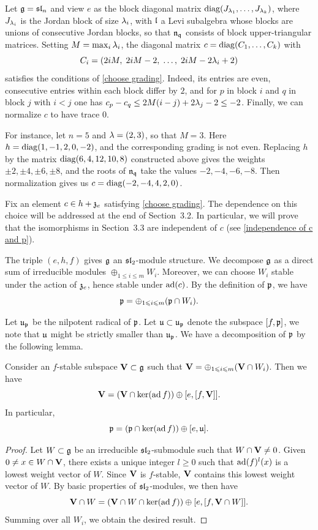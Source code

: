 \documentclass[11pt]{article}
\numberwithin{equation}{section}
\begin{document}
\begin{exa}
Let $\mathfrak{g}=\mathfrak{sl}_n$ and view $e$ as the block diagonal matrix
$\operatorname{diag}(J_{\lambda_1},\dots,J_{\lambda_k})$, where $J_{\lambda_i}$ is the Jordan block of size
$\lambda_i$, with $\mathfrak{l}$ a Levi subalgebra whose blocks are unions of consecutive
Jordan blocks, so that $\mathfrak{n}_{\mathfrak{q}}$ consists of block upper-triangular matrices.
Setting $M=\max_i\lambda_i$, the diagonal matrix $c=\operatorname{diag}(C_1,\dots,C_k)$ with
\[
C_i=(2iM,\;2iM-2,\;\dots,\;2iM-2\lambda_i+2)
\]
satisfies the conditions of \cref{choose grading}. Indeed, its entries are even,
consecutive entries within each block differ by $2$, and for $p$ in block $i$ and
$q$ in block $j$ with $i<j$ one has
$c_p-c_q\le 2M(i-j)+2\lambda_j-2\le-2$. Finally, we can normalize $c$ to have trace $0$.

For instance, let $n=5$ and $\lambda=(2,3)$, so that $M=3$. Here $h=\operatorname{diag}(1,-1,2,0,-2)$, and the corresponding grading is not even. Replacing $h$ by the matrix $\operatorname{diag}(6,4,12,10,8)$ constructed above gives the weights $\pm2,\pm4,\pm6,\pm8$, and the roots of $\mathfrak{n}_{\mathfrak{q}}$ take the values $-2,-4,-6,-8$. Then normalization gives us $c=\operatorname{diag}(-2,-4,4,2,0)$.
\end{exa}

Fix an element $c\in h+\mathfrak{z}_e$ satisfying
\cref{choose grading}. The dependence on this choice will
be addressed at the end of Section~3.2. In particular,
we will prove that the isomorphisms in Section~3.3 are
independent of $c$ (see \cref{independence of c and p}).


The triple $(e,h,f)$ gives $\mathfrak{g}$ an $\mathfrak{sl}_2$-module structure. We decompose $\mathfrak{g}$ as a direct sum of irreducible modules $\oplus_{1\leqslant i\leqslant m} W_i$. Moreover, we can choose $W_i$ stable under the action of $\mathfrak{z}_e$, hence stable under $\operatorname{ad}(c)$. By the definition of $\mathfrak{p}$, we have 
$$\mathfrak{p}=\oplus_{1\leqslant i\leqslant m} (\mathfrak{p}\cap W_i).$$ 

Let $\mathfrak{u}_{\mathfrak{p}}$ be the nilpotent radical of $\mathfrak{p}$. Let $\mathfrak{u}\subset \mathfrak{u}_{\mathfrak{p}}$ denote the subspace $[f, \mathfrak{p}]$, we note that $\mathfrak{u}$ might be strictly smaller than $\mathfrak{u}_{\mathfrak{p}}$. We have a decomposition of $\mathfrak{p}$ by the following lemma.
\begin{lem} \label{decompose p}
Consider an $f$-stable subspace $\mathbf{V} \subset \mathfrak{g}$ such that $\mathbf{V}= \oplus_{1\leqslant i\leqslant m} (\mathbf{V}\cap W_i)$. Then we have
$$\mathbf{V}= (\mathbf{V}\cap \ker (\operatorname{ad} f))\oplus [e,[f,\mathbf{V}]].$$
In particular, 
    $$\mathfrak{p}= (\mathfrak{p}\cap \ker (\operatorname{ad} f))\oplus [e,\mathfrak{u}].$$
\end{lem}
\begin{proof}
    Let $W\subset \mathfrak{g}$ be an irreducible $\mathfrak{sl}_2$-submodule such that $W\cap \mathbf{V}\neq 0$. Given $0\neq x\in W\cap \mathbf{V}$, there exists a unique integer $l\geqslant 0$ such that $\operatorname{ad}(f)^l(x)$ is a lowest weight vector of $W$. Since $\mathbf{V}$ is $f$-stable, $\mathbf{V}$ contains this lowest weight vector of $W$. By basic properties of $\mathfrak{sl}_2$-modules, we then have
$$
\mathbf{V}\cap W=(\mathbf{V}\cap W\cap \ker(\operatorname{ad} f))\oplus [e,[f,\mathbf{V}\cap W]].
$$
Summing over all $W_i$, we obtain the desired result.
\end{proof}
\end{document}
